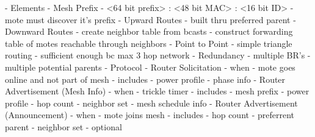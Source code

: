 - Elements
    - Mesh Prefix
        - <64 bit prefix> : <48 bit MAC> : <16 bit ID>
        - mote must discover it's prefix
    - Upward Routes
        - built thru preferred parent
    - Downward Routes
        - create neighbor table from bcasts
        - construct forwarding table of motes reachable through neighbors
    - Point to Point
        - simple triangle routing
        - sufficient enough bc max 3 hop network
    - Redundancy
        - multiple BR's
        - multiple potential parents
- Protocol
    - Router Solicitation
        - when
            - mote goes online and not part of mesh
        - includes
            - power profile
            - phase info
    - Router Advertisement (Mesh Info)
        - when
            - trickle timer
        - includes
            - mesh prefix
            - power profile
            - hop count
            - neighbor set
            - mesh schedule info
    - Router Advertisement (Announcement)
        - when
            - mote joins mesh
        - includes
            - hop count
            - preferrent parent
            - neighbor set
        - optional
\fi

